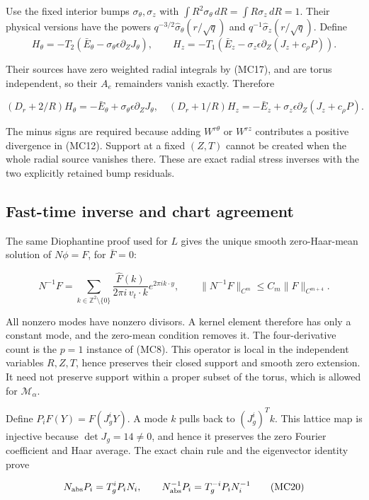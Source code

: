 \documentclass[10pt,a4paper]{article}
\begin{document}
Use the fixed interior bumps \(\sigma_\theta,\sigma_z\) with \(\int R^2\sigma_\theta\,dR=\int R\sigma_z\,dR=1\). Their physical versions have the powers \(q^{-3/2}\widehat\sigma_\theta(r/\sqrt q)\) and \(q^{-1}\widehat\sigma_z(r/\sqrt q)\). Define
\[
H_\theta=-T_2(\bar E_\theta-\sigma_\theta\epsilon\partial_ZJ_\theta),
\qquad
H_z=-T_1(\bar E_z-\sigma_z\epsilon\partial_Z(J_z+c_\rho P)).
\]

Their sources have zero weighted radial integrals by (MC17), and are torus independent, so their \(A_e\) remainders vanish exactly. Therefore

\[
(D_r+2/R)H_\theta=-\bar E_\theta+\sigma_\theta\epsilon\partial_ZJ_\theta,
\quad
(D_r+1/R)H_z=-\bar E_z+\sigma_z\epsilon\partial_Z(J_z+c_\rho P).
\tag{MC18}
\]

The minus signs are required because adding \(W^{r\theta}\) or \(W^{rz}\) contributes a positive divergence in (MC12). Support at a fixed \((Z,T)\) cannot be created when the whole radial source vanishes there. These are exact radial stress inverses with the two explicitly retained bump residuals.

\subsection{Fast-time inverse and chart agreement}

The same Diophantine proof used for \(L\) gives the unique smooth zero-Haar-mean solution of \(N\phi=F\), for \(\bar F=0\):

\[
N^{-1}F=\sum_{k\in\mathbb Z^2\setminus\{0\}}
\frac{\widehat F(k)}{2\pi i\,v_t\cdot k}e^{2\pi ik\cdot y},
\qquad
\|N^{-1}F\|_{C^m}\le C_m\|F\|_{C^{m+4}}.
\tag{MC19}
\]

All nonzero modes have nonzero divisors. A kernel element therefore has only a constant mode, and the zero-mean condition removes it. The four-derivative count is the \(p=1\) instance of (MC8). This operator is local in the independent variables \(R,Z,T\), hence preserves their closed support and smooth zero extension. It need not preserve support within a proper subset of the torus, which is allowed for \(\mathcal M_\alpha\).

Define \(P_iF(Y)=F(J_g^iY)\). A mode \(k\) pulls back to \((J_g^i)^Tk\). This lattice map is injective because \(\det J_g=14\ne0\), and hence it preserves the zero Fourier coefficient and Haar average. The exact chain rule and the eigenvector identity prove

\[
N_{\rm abs}P_i=T_g^iP_iN_i,
\qquad N_{\rm abs}^{-1}P_i=T_g^{-i}P_iN_i^{-1}
\tag{MC20}
\]
\end{document}
